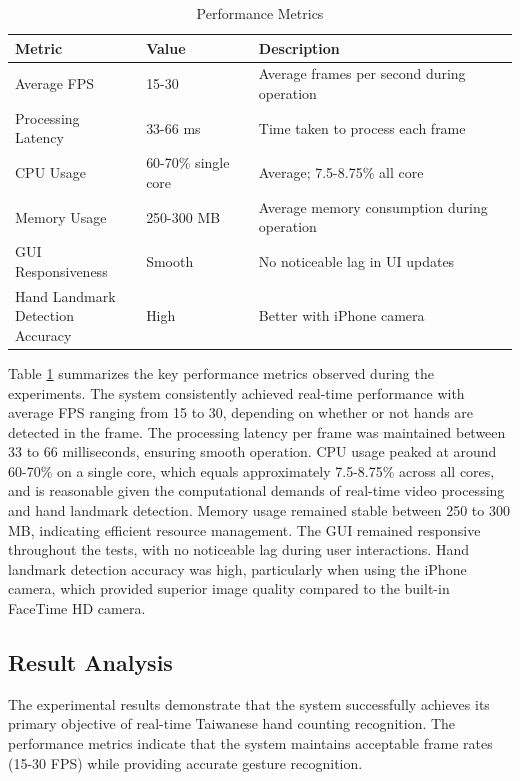 \documentclass{article}
\begin{document}
\begin{table}[H]
\centering
\begin{tabularx}{\textwidth}{|l|l|X|}
		\hline
		\textbf{Metric} & \textbf{Value} & \textbf{Description} \\\hline
		Average FPS & 15-30 & Average frames per second during operation \\\hline
		Processing Latency & 33-66 ms & Time taken to process each frame \\\hline
		CPU Usage & 60-70\% single core & Average; 7.5-8.75\% all core \\\hline
		Memory Usage & 250-300 MB & Average memory consumption during operation \\\hline
		GUI Responsiveness & Smooth & No noticeable lag in UI updates \\\hline
		\makecell[l]{Hand Landmark\\Detection Accuracy} & High & Better with iPhone camera \\\hline
	\end{tabularx}
	\caption{Performance Metrics}
	\label{tab:performance_metrics}
	\end{table}

Table \ref{tab:performance_metrics} summarizes the key performance metrics observed during the experiments. The system consistently achieved real-time performance with average FPS ranging from 15 to 30, depending on whether or not hands are detected in the frame. The processing latency per frame was maintained between 33 to 66 milliseconds, ensuring smooth operation. CPU usage peaked at around 60-70\% on a single core, which equals approximately 7.5-8.75\% across all cores, and is reasonable given the computational demands of real-time video processing and hand landmark detection. Memory usage remained stable between 250 to 300 MB, indicating efficient resource management. The GUI remained responsive throughout the tests, with no noticeable lag during user interactions. Hand landmark detection accuracy was high, particularly when using the iPhone camera, which provided superior image quality compared to the built-in FaceTime HD camera.

\subsection{Result Analysis}

The experimental results demonstrate that the system successfully achieves its primary objective of real-time Taiwanese hand counting recognition. The performance metrics indicate that the system maintains acceptable frame rates (15-30 FPS) while providing accurate gesture recognition.
\end{document}
